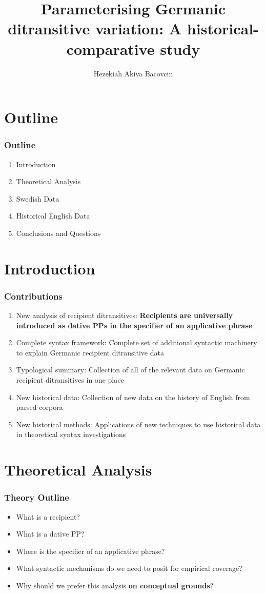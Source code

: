 \documentclass{beamer}
\title[]{\textbf{Parameterising Germanic ditransitive variation: A historical-comparative study}}
\author{Hezekiah Akiva Bacovcin}
\institute{University of Pennsylvania - Department of Linguistics}
\begin{document}
\begin{frame}
\titlepage
\end{frame}

\section{Outline}
\begin{frame}
\frametitle{Outline}
\begin{enumerate}
\item Introduction
\item Theoretical Analysis
\item Swedish Data
\item Historical English Data
\item Conclusions and Questions
\end{enumerate}
\end{frame}

\section{Introduction}
\begin{frame}
		\frametitle{Contributions}
		\begin{enumerate}
			\item New analysis of recipient ditransitives: \textbf{Recipients are universally introduced as dative PPs in the specifier of an applicative phrase}
			\item Complete syntax framework: Complete set of additional syntactic machinery to explain Germanic recipient ditransitive data
			\item Typological summary: Collection of all of the relevant data on Germanic recipient ditransitives in one place
			\item New historical data: Collection of new data on the history of English from parsed corpora
			\item New historical methods: Applications of new techniques to use historical data in theoretical syntax investigations
		\end{enumerate}
\end{frame}

\section{Theoretical Analysis}
\begin{frame}
	\frametitle{Theory Outline}
	\begin{itemize}
		\item What is a recipient?
		\item What is a dative PP?
		\item Where is the specifier of an applicative phrase?
		\item What syntactic mechanisms do we need to posit for empirical coverage?
		\item Why should we prefer this analysis \textbf{on conceptual grounds}?
	\end{itemize}
\end{frame}
\end{document}
